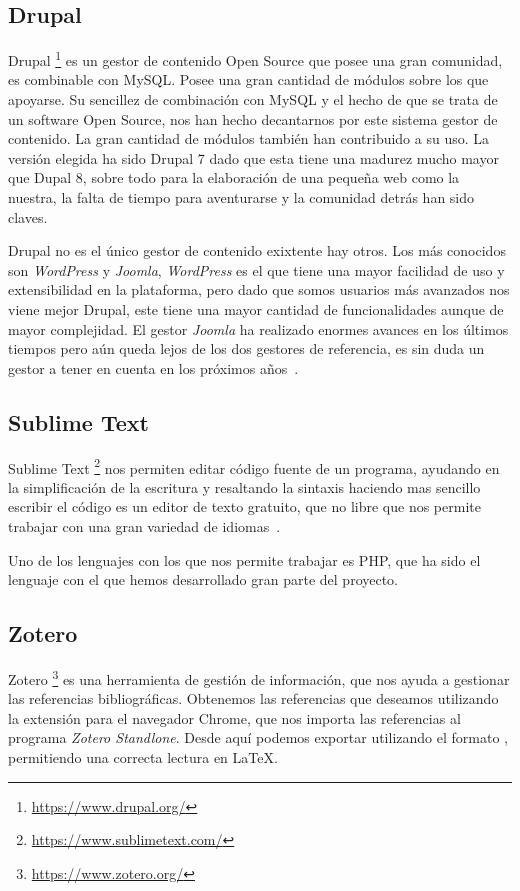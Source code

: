 \subsection{Drupal}
Drupal \footnote{\url{https://www.drupal.org/}} es un gestor de contenido Open Source que posee una gran comunidad, es combinable con MySQL. Posee una gran cantidad de módulos sobre los que apoyarse.
Su sencillez de combinación con MySQL y el hecho de que se trata de un software Open Source, nos han hecho decantarnos por este sistema gestor de contenido. La gran cantidad de módulos también han contribuido a su uso.
La versión elegida ha sido Drupal 7 dado que esta tiene una madurez mucho mayor que Dupal 8, sobre todo para la elaboración de una pequeña web como la nuestra, la falta de tiempo para aventurarse y la comunidad detrás han sido claves.

Drupal no es el único gestor de contenido exixtente hay otros. Los más conocidos son \textit{WordPress} y \textit{Joomla}, \textit{WordPress} es el que tiene una mayor facilidad de uso y extensibilidad en la plataforma, pero dado que somos usuarios más avanzados nos viene mejor Drupal, este tiene una mayor cantidad de funcionalidades aunque de mayor complejidad. El gestor \textit{Joomla} ha realizado enormes avances en los últimos tiempos pero aún queda lejos de los dos gestores de referencia, es sin duda un gestor a tener en cuenta en los próximos años~\cite{comparacion_cms_2016}.

\subsection{Sublime Text}

Sublime Text \footnote{\url{https://www.sublimetext.com/}} nos permiten editar código fuente de un programa, ayudando en la simplificación de la escritura y resaltando la sintaxis haciendo mas sencillo escribir el código es un editor de texto gratuito, que no libre que nos permite trabajar con una gran variedad de idiomas~\cite{wiki:sublime_text}.

Uno de los lenguajes con los que nos permite trabajar es PHP, que ha sido el lenguaje con el que hemos desarrollado gran parte del proyecto.

\subsection{Zotero}

Zotero \footnote{\url{https://www.zotero.org/}} es una herramienta de gestión de información, que nos ayuda a gestionar las referencias bibliográficas. Obtenemos las referencias que deseamos utilizando la extensión para el navegador Chrome, que nos importa las referencias al programa \textit{Zotero Standlone}. Desde aquí podemos exportar utilizando el formato , permitiendo una correcta lectura en \LaTeX.

